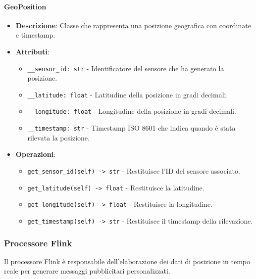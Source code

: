 \documentclass[10pt]{article}
\begin{document}
    \paragraph{GeoPosition}
    \begin{itemize}
        \item \textbf{Descrizione}: Classe che rappresenta una posizione geografica con coordinate e timestamp.
        \item \textbf{Attributi}:
        \begin{itemize}
            \item \texttt{\_\_sensor\_id: str} - Identificatore del sensore che ha generato la posizione.
            \item \texttt{\_\_latitude: float} - Latitudine della posizione in gradi decimali.
            \item \texttt{\_\_longitude: float} - Longitudine della posizione in gradi decimali.
            \item \texttt{\_\_timestamp: str} - Timestamp ISO 8601 che indica quando è stata rilevata la posizione.
        \end{itemize}
        \item \textbf{Operazioni}:
        \begin{itemize}
            \item \texttt{get\_sensor\_id(self) -> str} - Restituisce l'ID del sensore associato.
            \item \texttt{get\_latitude(self) -> float} - Restituisce la latitudine.
            \item \texttt{get\_longitude(self) -> float} - Restituisce la longitudine.
            \item \texttt{get\_timestamp(self) -> str} - Restituisce il timestamp della rilevazione.
        \end{itemize}
    \end{itemize}

    \subsubsection{Processore Flink}
    Il processore Flink è responsabile dell'elaborazione dei dati di posizione in tempo reale per generare messaggi pubblicitari personalizzati.
\end{document}
